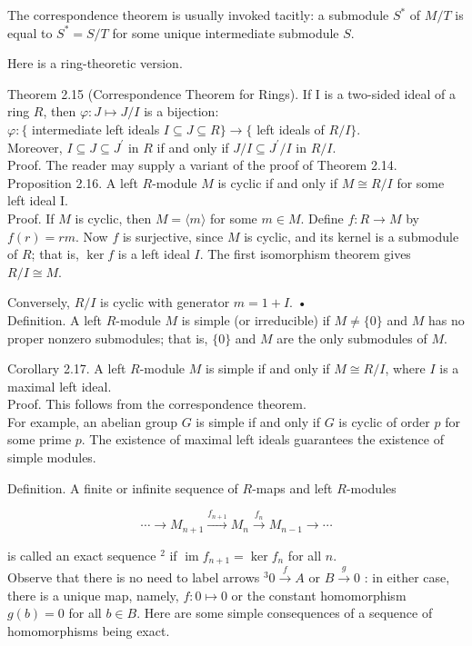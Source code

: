 \documentclass[10pt]{article}
\begin{document}
The correspondence theorem is usually invoked tacitly: a submodule $S^{*}$ of $M / T$ is equal to $S^{*}=S / T$ for some unique intermediate submodule $S$.

Here is a ring-theoretic version.

Theorem 2.15 (Correspondence Theorem for Rings). If I is a two-sided ideal of a ring $R$, then $\varphi: J \mapsto J / I$ is a bijection:\\
$\varphi:\{$ intermediate left ideals $I \subseteq J \subseteq R\} \rightarrow\{$ left ideals of $R / I\}$.\\
Moreover, $I \subseteq J \subseteq J^{\prime}$ in $R$ if and only if $J / I \subseteq J^{\prime} / I$ in $R / I$.\\
Proof. The reader may supply a variant of the proof of Theorem 2.14.\\
Proposition 2.16. A left $R$-module $M$ is cyclic if and only if $M \cong R / I$ for some left ideal I.\\
Proof. If $M$ is cyclic, then $M=\langle m\rangle$ for some $m \in M$. Define $f: R \rightarrow M$ by $f(r)=r m$. Now $f$ is surjective, since $M$ is cyclic, and its kernel is a submodule of $R$; that is, $\operatorname{ker} f$ is a left ideal $I$. The first isomorphism theorem gives $R / I \cong M$.

Conversely, $R / I$ is cyclic with generator $m=1+I$. •\\
Definition. A left $R$-module $M$ is simple (or irreducible) if $M \neq\{0\}$ and $M$ has no proper nonzero submodules; that is, $\{0\}$ and $M$ are the only submodules of $M$.

Corollary 2.17. A left $R$-module $M$ is simple if and only if $M \cong R / I$, where $I$ is a maximal left ideal.\\
Proof. This follows from the correspondence theorem.\\
For example, an abelian group $G$ is simple if and only if $G$ is cyclic of order $p$ for some prime $p$. The existence of maximal left ideals guarantees the existence of simple modules.

Definition. A finite or infinite sequence of $R$-maps and left $R$-modules

$$
\cdots \rightarrow M_{n+1} \xrightarrow{f_{n+1}} M_{n} \xrightarrow{f_{n}} M_{n-1} \rightarrow \cdots
$$

is called an exact sequence $^{2}$ if $\operatorname{im} f_{n+1}=\operatorname{ker} f_{n}$ for all $n$.\\
Observe that there is no need to label arrows ${ }^{3} 0 \xrightarrow{f} A$ or $B \xrightarrow{g} 0$ : in either case, there is a unique map, namely, $f: 0 \mapsto 0$ or the constant homomorphism $g(b)=0$ for all $b \in B$. Here are some simple consequences of a sequence of homomorphisms being exact.
\end{document}
